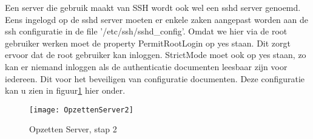             Een server die gebruik maakt van SSH wordt ook wel een sshd server genoemd. Eens ingelogd op de sshd server moeten er enkele zaken aangepast worden aan de ssh configuratie in de file '/etc/ssh/sshd\_config'. Omdat we hier via de root gebruiker werken moet de property PermitRootLogin op yes staan. Dit zorgt ervoor dat de root gebruiker kan inloggen.
            StrictMode moet ook op yes staan, zo kan er niemand inloggen als de authenticatie documenten leesbaar zijn voor iedereen. Dit voor het beveiligen van configuratie documenten. Deze configuratie kan u zien in figuur\ref{OpzettenServer2} hier onder.
            
            \begin{figure}
                \centering
                \texttt{[image: OpzettenServer2]}
                \caption{Opzetten Server, stap 2} \label{OpzettenServer2}
            \end{figure}
            
